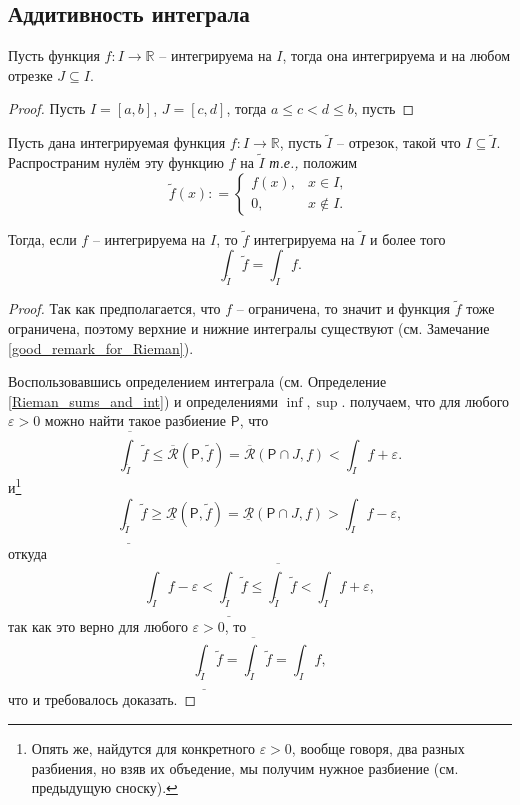\subsection{Аддитивность интеграла}

\begin{lemma}\label{restriction_of_int}
    Пусть функция $f:I \to \mathbb{R}$ -- интегрируема на $I$, тогда она интегрируема и на любом отрезке $J \subseteq I$. 
\end{lemma}

\begin{proof}
Пусть $I = [a,b]$, $J = [c,d]$, тогда $a \le c < d \le b$, пусть
\end{proof}

\begin{lemma}\label{int_of_extension_by_0}
    Пусть дана интегрируемая функция $f: I \to \mathbb{R}$, пусть $\widetilde{I}$ -- отрезок, такой что $I \subseteq \widetilde{I}$. Распространим нулём эту функцию $f$ на $\widetilde{I}$ \textit{т.е.,} положим
    \[
     \widetilde{f}(x): = \begin{cases}
         f(x), & x \in I,\\
         0, & x \notin I.
     \end{cases}
    \]

Тогда, если $f$ -- интегрируема на $I$, то $\widetilde{f}$ интегрируема на $\widetilde{I}$ и более того
\[
 \int_{\widetilde{I}}\widetilde{f} = \int_I f.
\]
\end{lemma}

\begin{proof}
Так как предполагается, что $f$ -- ограничена, то значит и функция $\widetilde{f}$ тоже ограничена, поэтому верхние и нижние интегралы существуют (см. Замечание \ref{good_remark_for_Rieman}).

Воспользовавшись определением интеграла (см. Определение \ref{Rieman_sums_and_int}) и определениями $\inf, \sup$. получаем, что для любого $\varepsilon>0$ можно найти такое разбиение $\mathsf{P}$, что
    \[
     \overline{\int_{\widetilde{I}}} \widetilde{f} \le \overline{\mathcal{R}}(\mathsf{P},\widetilde{f}) = \overline{\mathcal{R}}(\mathsf{P}\cap J, f) < \int_I f + \varepsilon.
    \]
и\footnote{Опять же, найдутся для конкретного $\varepsilon>0$, вообще говоря, два разных разбиения, но взяв их объедение, мы получим нужное разбиение (см. предыдущую сноску).}
    \[
     \underline{\int_{\widetilde{I}}} \widetilde{f} \ge \underline{\mathcal{R}}(\mathsf{P},\widetilde{f}) = \underline{\mathcal{R}}(\mathsf{P}\cap J, f) > \int_I f - \varepsilon,
    \]
откуда
\[
 \int_I f - \varepsilon < \underline{\int_{\widetilde{I}}}\widetilde{f} \le \overline{\int_{\widetilde{I}}}\widetilde{f} < \int_I f + \varepsilon,
\]
так как это верно для любого $\varepsilon>0$, то 
\[
 \underline{\int_{\widetilde{I}}}\widetilde{f} = \overline{\int_{\widetilde{I}}}\widetilde{f} = \int_I f,
\]
что и требовалось доказать.
\end{proof}

